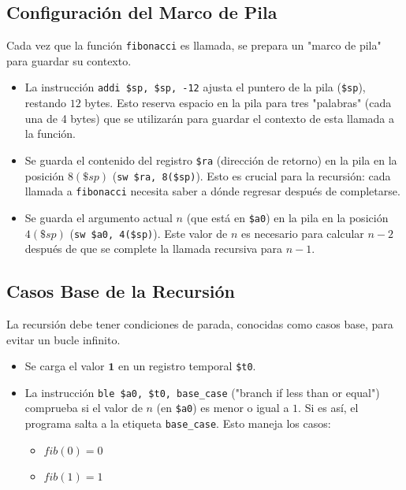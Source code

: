 \documentclass{article}
\begin{document}
\subsection*{Configuración del Marco de Pila}
Cada vez que la función \texttt{fibonacci} es llamada, se prepara un "marco de pila" para guardar su contexto.
\begin{itemize}
    \item La instrucción \texttt{addi \$sp, \$sp, -12} ajusta el puntero de la pila (\texttt{\$sp}), restando $12$ bytes. Esto reserva espacio en la pila para tres "palabras" (cada una de 4 bytes) que se utilizarán para guardar el contexto de esta llamada a la función.
    \item Se guarda el contenido del registro \texttt{\$ra} (dirección de retorno) en la pila en la posición $8(\$sp)$ (\texttt{sw \$ra, 8(\$sp)}). Esto es crucial para la recursión: cada llamada a \texttt{fibonacci} necesita saber a dónde regresar después de completarse.
    \item Se guarda el argumento actual $n$ (que está en \texttt{\$a0}) en la pila en la posición $4(\$sp)$ (\texttt{sw \$a0, 4(\$sp)}). Este valor de $n$ es necesario para calcular $n-2$ después de que se complete la llamada recursiva para $n-1$.
\end{itemize}

\subsection*{Casos Base de la Recursión}
La recursión debe tener condiciones de parada, conocidas como casos base, para evitar un bucle infinito.
\begin{itemize}
    \item Se carga el valor $\mathbf{1}$ en un registro temporal \texttt{\$t0}.
    \item La instrucción \texttt{ble \$a0, \$t0, base_case} ("branch if less than or equal") comprueba si el valor de $n$ (en \texttt{\$a0}) es menor o igual a $1$. Si es así, el programa salta a la etiqueta \texttt{base\_case}. Esto maneja los casos:
        \begin{itemize}
            \item $fib(0) = 0$
            \item $fib(1) = 1$
        \end{itemize}
\end{itemize}
\end{document}
